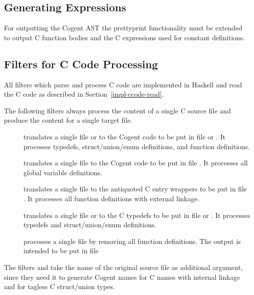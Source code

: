 \subsection{Generating Expressions}
\label{impl-ccode-expr}

For outputting the Cogent AST the prettyprint functionality must be extended to 
output C function bodies and the C expressions used for constant definitions.

\subsection{Filters for C Code Processing}
\label{impl-ccode-filters}

All filters which parse and process C code are implemented in Haskell and read the
C code as described in Section~\ref{impl-ccode-read}.

The following filters always process the content of a single C source file and produce the content for a single 
target file.
\begin{description}
\item[] translates a single file  or  to the Cogent code to be put in file
 or . It processes typedefs, struct/union/enum definitions, and function
definitions. 
\item[] translates a single file  to the Cogent code to be put in file .
It processes all global variable definitions.
\item[] translates a single file  to the antiquoted C entry wrappers to be put in
file . It processes all function definitions with external linkage.
\item[] translates a single file  or  to the C typedefs to be put in
file  or . It processes typedefs and struct/union/enum definitions.
\item[] processes a single file  by removing all function definitions. The output
is intended to be put in file 
\end{description}

The filters  and  take the name of the original source file as additional
argument, since they need it to generate Cogent names for C names with internal linkage and for tagless C struct/union
types.

